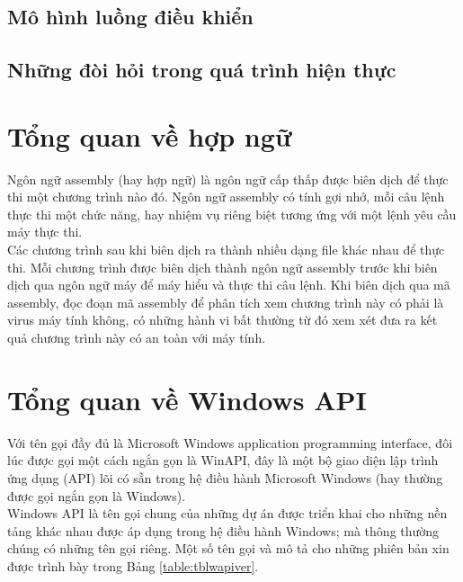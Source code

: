 	\subsection{Mô hình luồng điều khiển}

	\subsection{Những đòi hỏi trong quá trình hiện thực}

\section{Tổng quan về hợp ngữ}
Ngôn ngữ assembly (hay hợp ngữ) là ngôn ngữ cấp thấp được biên dịch để thực thi một chương trình nào đó. Ngôn ngữ assembly có tính gợi nhớ, mỗi câu lệnh thực thi một chức năng, hay nhiệm vụ riêng biệt tương ứng với một lệnh yêu cầu máy thực thi. \\

Các chương trình sau khi biên dịch ra thành nhiều dạng file khác nhau để thực thi. Mỗi chương trình được biên dịch thành ngôn ngữ assembly trước khi biên dịch qua ngôn ngữ máy để máy hiểu và thực thi câu lệnh. Khi biên dịch qua mã assembly, đọc đoạn mã assembly để phân tích xem chương trình này có phải là virus máy tính không, có những hành vi bất thường từ đó xem xét đưa ra kết quả chương trình này có an toàn với máy tính.\\

\section {Tổng quan về Windows API}

Với tên gọi đầy đủ là Microsoft Windows application programming interface, đôi lúc được gọi một cách ngắn gọn là WinAPI, đây là một bộ giao diện lập trình ứng dụng (API) lõi có sẵn trong hệ điều hành Microsoft Windows (hay thường được gọi ngắn gọn là Windows).\\

Windows API là tên gọi chung của những dự án được triển khai cho những nền tảng khác nhau được áp dụng trong hệ điều hành Windows; mà thông thường chúng có những tên gọi riêng. Một số tên gọi và mô tả cho những phiên bản xin được trình bày trong Bảng \ref{table:tblwapiver}.


